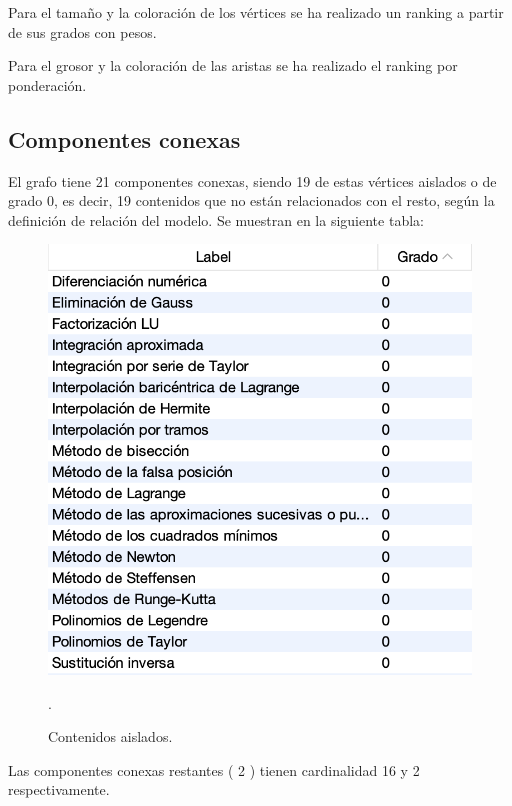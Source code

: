 \documentclass[a4paper,10pt,twocolumn]{article}
\begin{document}
        Para el tamaño y la coloración de los vértices se ha realizado un ranking a partir de sus grados con pesos.

        Para el grosor y la coloración de las aristas se ha realizado el ranking por ponderación.
        \newpage
        
        \newpage
        \newpage

        \subsection{Componentes conexas}
        El grafo tiene 21 componentes conexas, siendo 19 de estas vértices aislados o de grado 0, es decir, 19 contenidos que no están relacionados con el resto, según la definición de relación del modelo. Se muestran en la siguiente tabla:
        
        \begin{figure}[h!]
            \centering
            \includegraphics[scale=0.55]{vertex_deg_0.png}
            \caption{Contenidos aislados. \label{fig:ex}}
.        \end{figure}

        Las componentes conexas restantes ( 2 ) tienen cardinalidad 16 y 2 respectivamente.
\end{document}
